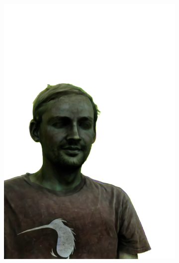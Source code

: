 \begin{figure}[ht]
\begin{subfigure}{0.08\linewidth}
        \includegraphics[width=\textwidth]{Figures/results/low/simon_stone/11_render.png}
	\end{subfigure}
    \begin{subfigure}{0.08\linewidth}%

\end{subfigure}
\end{figure}
